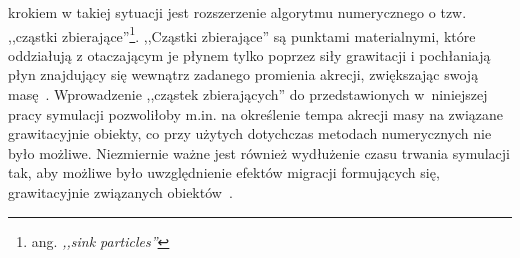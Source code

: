 krokiem w takiej sytuacji jest rozszerzenie algorytmu numerycznego o tzw.
,,cząstki zbierające''\footnote{ang. \emph{,,sink particles''}}. ,,Cząstki
zbierające'' są punktami materialnymi, które oddziałują z otaczającym je
płynem tylko poprzez siły grawitacji i pochłaniają płyn znajdujący się wewnątrz
zadanego promienia akrecji, zwiększając swoją masę~\cite{FBCK10}. Wprowadzenie
,,cząstek zbierających'' do przedstawionych w~niniejszej pracy symulacji
pozwoliłoby m.in. na określenie tempa akrecji masy na związane grawitacyjnie
obiekty, co przy użytych dotychczas metodach numerycznych nie było możliwe.
Niezmiernie ważne jest również wydłużenie czasu trwania symulacji tak, aby
możliwe było uwzględnienie efektów migracji formujących się, grawitacyjnie
związanych obiektów~\cite{ML14}.




